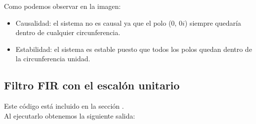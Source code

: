 \documentclass[11pt,a4paper]{article}
\begin{document}
Como podemos observar en la imagen:

\begin{itemize}
	\item Causalidad: el sistema no es causal ya que el polo (0, 0$i$) siempre quedaría dentro de cualquier circunferencia.
	\item Estabilidad: el sistema es estable puesto que todos los polos quedan dentro de la circunferencia unidad.
\end{itemize}

\subsection{Filtro FIR con el escalón unitario}

Este código está incluido en la sección \color{deepred}\color{black}.\\

Al ejecutarlo obtenemos la siguiente salida:
\end{document}
